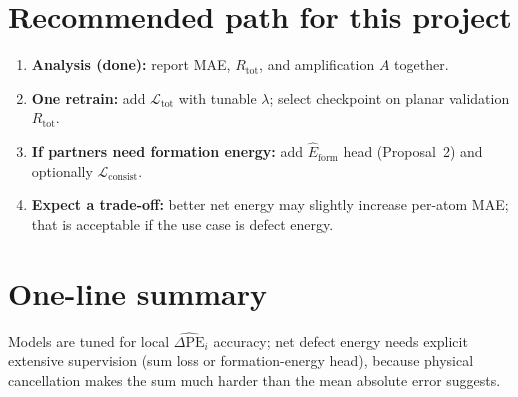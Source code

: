 \documentclass[11pt,a4paper]{article}
\newcommand{\dPEhat}{\widehat{\Delta\mathrm{PE}}}
\begin{document}
\section*{Recommended path for this project}

\begin{enumerate}
  \item \textbf{Analysis (done):} report MAE, $R_{\mathrm{tot}}$, and amplification $A$ together.
  \item \textbf{One retrain:} add $\mathcal{L}_{\mathrm{tot}}$ with tunable $\lambda$; select checkpoint on planar validation $R_{\mathrm{tot}}$.
  \item \textbf{If partners need formation energy:} add $\widehat{E}_{\mathrm{form}}$ head (Proposal~2) and optionally $\mathcal{L}_{\mathrm{consist}}$.
  \item \textbf{Expect a trade-off:} better net energy may slightly increase per-atom MAE; that is acceptable if the use case is defect energy.
\end{enumerate}

\section*{One-line summary}

Models are tuned for local $\dPEhat_i$ accuracy; net defect energy needs explicit extensive supervision (sum loss or formation-energy head), because physical cancellation makes the sum much harder than the mean absolute error suggests.
\end{document}
